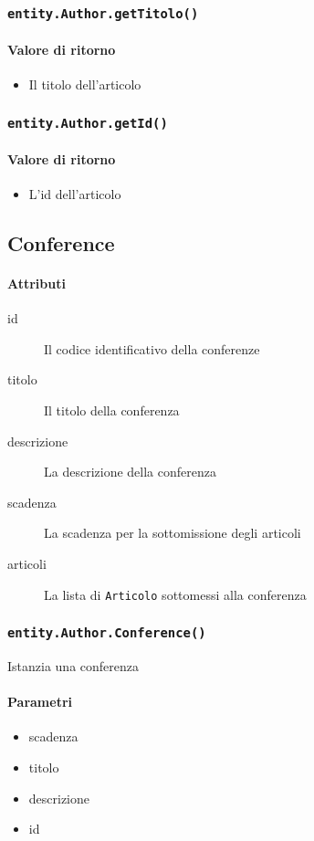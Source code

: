 \subsubsection{\texttt{entity.Author.getTitolo()}}
\paragraph{Valore di ritorno}
\begin{itemize}
\item Il titolo dell'articolo
\end{itemize}

\subsubsection{\texttt{entity.Author.getId()}}
\paragraph{Valore di ritorno}
\begin{itemize}
\item L'id dell'articolo
\end{itemize}

\subsection{Conference}
\paragraph{Attributi}
\begin{description}
\item[id] Il codice identificativo della conferenze
\item[titolo] Il titolo della conferenza
\item[descrizione] La descrizione della conferenza
\item[scadenza] La scadenza per la sottomissione degli articoli
\item[articoli] La lista di \texttt{Articolo} sottomessi alla conferenza
\end{description}

\subsubsection{\texttt{entity.Author.Conference()}}
Istanzia una conferenza
\paragraph{Parametri}
\begin{itemize}
\item scadenza
\item titolo
\item descrizione
\item id
\end{itemize}

